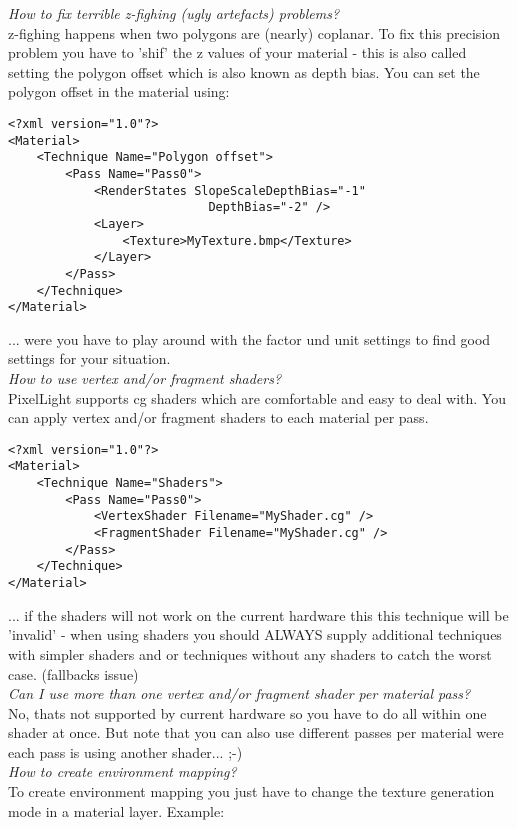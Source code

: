\emph{How to fix terrible z-fighing (ugly artefacts) problems?}\\
z-fighing happens when two polygons are (nearly) coplanar. To fix this precision problem you have
to 'shif' the z values of your material - this is also called setting the polygon offset which is
also known as depth bias. You can set the polygon offset in the material using:\\

\begin{lstlisting}[caption=Polygon offset]
<?xml version="1.0"?>
<Material>
	<Technique Name="Polygon offset">
		<Pass Name="Pass0">
			<RenderStates SlopeScaleDepthBias="-1" 
							DepthBias="-2" />
			<Layer>
				<Texture>MyTexture.bmp</Texture>
			</Layer>
		</Pass>
	</Technique>
</Material>
\end{lstlisting}

... were you have to play around with the factor und unit settings to find good settings for your
situation.\\


\emph{How to use vertex and/or fragment shaders?}\\
PixelLight supports cg shaders which are comfortable and easy to deal with. You can apply vertex
and/or fragment shaders to each material per pass.\\

\begin{lstlisting}[caption=Material and shaders]
<?xml version="1.0"?>
<Material>
	<Technique Name="Shaders">
		<Pass Name="Pass0">
			<VertexShader Filename="MyShader.cg" />
			<FragmentShader Filename="MyShader.cg" />
		</Pass>
	</Technique>
</Material>
\end{lstlisting}

... if the shaders will not work on the current hardware this this technique will be 'invalid'
- when using shaders you should ALWAYS supply additional techniques with simpler shaders and or
techniques without any shaders to catch the worst case. (fallbacks issue)\\


\emph{Can I use more than one vertex and/or fragment shader per material pass?}\\
No, thats not supported by current hardware so you have to do all within one shader at once.
But note that you can also use different passes per material were each pass is using another
shader... ;-)\\


\emph{How to create environment mapping?}\\
To create environment mapping you just have to change the texture generation mode in a material 
layer. Example:\\


